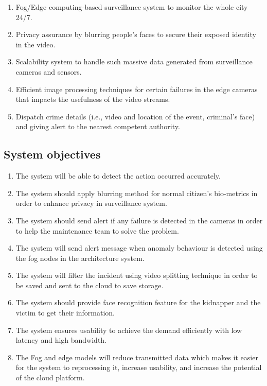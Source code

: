 \documentclass[12pt]{article}
\begin{document}
\begin{enumerate}
\item Fog/Edge computing-based surveillance system to monitor the whole city 24/7.

\item Privacy assurance by blurring people’s faces to secure their exposed identity in the video.
\item Scalability system to handle such massive data generated from surveillance cameras and sensors.
\item Efficient image processing techniques for certain failures in the edge cameras that impacts the usefulness of the video streams.
\item Dispatch crime details (i.e., video and location of the event, criminal’s face) and giving alert to the nearest competent authority.



\end{enumerate} 

\subsection{System objectives}
\begin{enumerate}


\item The system will be able to detect the action occurred accurately.

\item The system should apply blurring method for normal citizen’s bio-metrics in order to enhance privacy in surveillance system.
\item The system should send alert if any failure is detected in the cameras in order to help the maintenance team to solve the problem.
\item The system will send alert message when anomaly behaviour is detected using the fog nodes in the architecture system.

\item The system will filter the incident using video splitting technique in order to be saved and sent to the cloud to save storage.

\item The system should provide face recognition feature for the kidnapper and the victim to get their information.
\item The system ensures usability to achieve the demand efficiently with low latency and high bandwidth.
\item The Fog and edge models will reduce transmitted data which makes it easier for the system to reprocessing it, increase usability, and increase the potential of the cloud platform.

 \end{enumerate}
 \newpage
\end{document}
